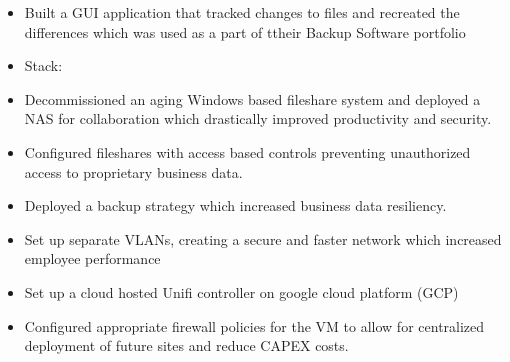 \divider

\begin{itemize}
    \item Built a GUI application that tracked changes to files and recreated the differences which was used as a part of ttheir Backup Software portfolio 
    \item Stack:   
\end{itemize}
\divider

\begin{itemize}
    \item Decommissioned an aging Windows based fileshare system and deployed a NAS for collaboration which drastically improved productivity and security.
    \item Configured fileshares with access based controls preventing unauthorized access to proprietary business data.
    \item Deployed a backup strategy which increased business data resiliency.
    \item Set up separate VLANs, creating a secure and faster network which increased employee performance
    \item Set up a cloud hosted Unifi controller on google cloud platform (GCP)
    \item Configured appropriate firewall policies for the VM to allow for centralized deployment of future sites and reduce CAPEX costs.
\end{itemize}
